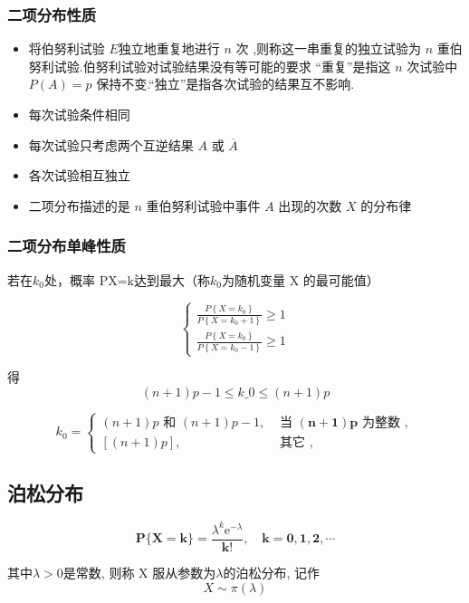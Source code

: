 \subsubsection{二项分布性质}

\begin{itemize}
    \item 将伯努利试验 $E$独立地重复地进行 $n$ 次 ,则称这一串重复的独立试验为 $n$ 重伯努利试验.伯努利试验对试验结果没有等可能的要求 “重复”是指这 $n$ 次试验中 $P(A)= p$ 保持不变.“独立”是指各次试验的结果互不影响.
    \item 每次试验条件相同
    \item 每次试验只考虑两个互逆结果 $A$ 或 $\overline{A}$
    \item 各次试验相互独立
    \item 二项分布描述的是 $n$ 重伯努利试验中事件 $A$ 出现的次数 $X$ 的分布律
\end{itemize}

\subsubsection{二项分布单峰性质}

若在$k_0$处，概率 P{X=k}达到最大（称$k_0$为随机变量 X 的最可能值）

$$
\left\{\begin{array}{l}
\frac{P\left\{X=k_{0}\right\}}{P\left\{X=k_{0}+1\right\}} \geq 1 \\
\frac{P\left\{X=k_{0}\right\}}{P\left\{X=k_{0}-1\right\}} \geq 1
\end{array}\right.
$$

得
$$ (n+1) p-1 \leq k\_{0} \leq(n+1) p $$

$$
k_{0}=\left\{\begin{array}{ll}
(n+1) p \text { 和 }(n+1) p-1, & \text { 当 }(\boldsymbol{n}+\mathbf{1}) \boldsymbol{p} \text { 为整数 }, \\
{[(n+1) p],} & \text { 其它 },
\end{array}\right.
$$

\subsection{泊松分布}

$$
\boldsymbol{P}\{\boldsymbol{X}=\boldsymbol{k}\}=\frac{\lambda^{k} \mathrm{e}^{-\lambda}}{\boldsymbol{k} !}, \quad \boldsymbol{k}=\mathbf{0}, \mathbf{1}, \mathbf{2}, \cdots
$$

其中$\lambda > 0$是常数, 则称 X 服从参数为$\lambda$的泊松分布, 记作
$$ X \sim \pi(\lambda) $$


